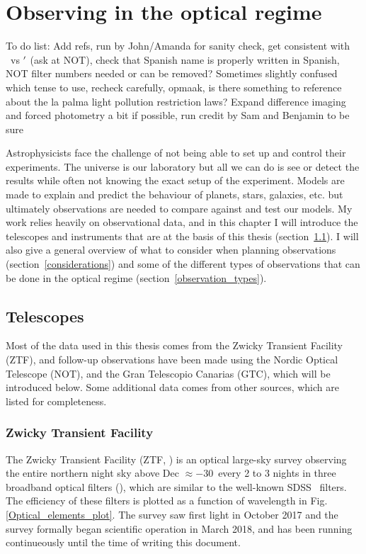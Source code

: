 \documentclass[a4paper,oneside,12pt, class=Latex/Classes/PhDthesisPSnPDF, crop=false]{standalone}
\begin{document}
\doublespacing
\chapter{Observing in the optical regime}
\label{chap:obs}

\color{red}To do list: Add refs, run by John/Amanda for sanity check, get consistent with \ztfg\ vs \ztfg$^{\prime}$ (ask at NOT), check that Spanish name is properly written in Spanish, NOT filter numbers needed or can be removed? Sometimes slightly confused which tense to use, recheck carefully, opmaak, is there something to reference about the la palma light pollution restriction laws? Expand difference imaging and forced photometry a bit if possible, run credit by Sam and Benjamin to be sure\color{black}

Astrophysicists face the challenge of not being able to set up and control their experiments. The universe is our laboratory but all we can do is see or detect the results while often not knowing the exact setup of the experiment. Models are made to explain and predict the behaviour of planets, stars, galaxies, etc. but ultimately observations are needed to compare against and test our models. My work relies heavily on observational data, and in this chapter I will introduce the telescopes and instruments that are at the basis of this thesis (section~\ref{telescopes}). I will also give a general overview of what to consider when planning observations (section~\ref{considerations}) and some of the different types of observations that can be done in the optical regime (section~\ref{observation_types}).

\section{Telescopes}
\label{telescopes}
Most of the data used in this thesis comes from the Zwicky Transient Facility (ZTF), and follow-up observations have been made using the Nordic Optical Telescope (NOT), and the Gran Telescopio Canarias (GTC), which will be introduced below. Some additional data comes from other sources, which are listed for completeness.

\subsection{Zwicky Transient Facility}
The Zwicky Transient Facility (ZTF, \citealt{ZTF_Surveys_Scheduler, ZTF_overview_and_1st_results, ZTF_Science_Objectives, ZTF_Instrumentation, ZTF_Observing_System}) is an optical large-sky survey observing the entire northern night sky above Dec $\approx -30$\degree\ every 2 to 3 nights in three broadband optical filters (\ztfg\ztfr\ztfi), which are similar to the well-known SDSS \ztfg\ztfr\ztfi\ filters. The efficiency of these filters is plotted as a function of wavelength in Fig. \ref{Optical_elements_plot}. The survey saw first light in October 2017 and the survey formally began scientific operation in March 2018, and has been running continueously until the time of writing this document.
\end{document}
